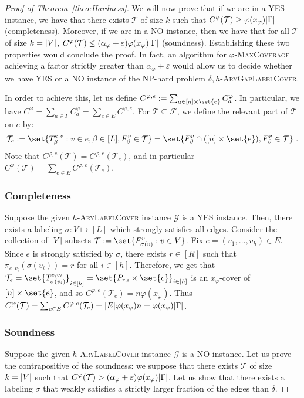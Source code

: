 \begin{proof}[Proof of Theorem~\ref{theo:Hardness}]
We will now prove that if we are in a YES instance, we have that there exists $\mathcal{T}$ of size $k$ such that $C^{\varphi}(\mathcal{T}) \geq \varphi(x_{\varphi})\abs{\Gamma}$ (completeness). Moreover, if we are in a NO instance, then we have that for all $\mathcal{T}$ of size $k = \abs{V}$, $C^{\varphi}(\mathcal{T}) \leq (\alpha_{\varphi} + \varepsilon)\varphi(x_{\varphi})\abs{\Gamma}$ (soundness). Establishing these two properties would conclude the proof. 
In fact, an algorithm for $\varphi$-\textsc{MaxCoverage} achieving a factor strictly greater than $\alpha_{\varphi} + \varepsilon$ would allow us to decide whether we have YES or a NO instance of the \textrm{NP}-hard problem $\delta,h$-\textsc{AryGapLabelCover}.

In order to achieve this, let us define $C^{\varphi,e} := \sum_{a \in [n] \times \set{e}} C^{\varphi}_a$. In particular, we have $C^{\varphi} = \sum_{a \in  \Gamma} C^{\varphi}_a = \sum_{e \in E}C^{\varphi,e}$. For $\mathcal{T} \subseteq \mathcal{F}$, we define the relevant part of $\mathcal{T}$ on $e$ by:
\[\mathcal{T}_e := \set{T_{\beta}^{e,v} : v \in e, \beta \in [L], F^v_{\beta} \in \mathcal{T}} = \set{F^v_{\beta} \cap ([n] \times \set{e}), F^v_{\beta} \in \mathcal{T}}\ .\]
Note that $C^{\varphi,e}(\mathcal{T}) = C^{\varphi,e}(\mathcal{T}_e)$, and in particular $C^{\varphi}(\mathcal{T}) = \sum_{e \in E} C^{\varphi,e}(\mathcal{T}_e)$. 

\subsubsection{Completeness}
Suppose the given $h$-\textsc{AryLabelCover} instance $\mathcal{G}$ is a YES instance. Then, there exists a labeling $\sigma : V \mapsto [L]$ which strongly satisfies all edges. Consider the collection of $\abs{V}$ subsets $\mathcal{T} := \set{F_{\sigma(v)}^v : v \in V}$. Fix $e = (v_1,\ldots,v_h) \in E$. Since $e$ is strongly satisfied by $\sigma$, there exists $r \in [R]$ such that $\pi_{e,v_i}(\sigma(v_i)) = r$ for all $i \in [h]$. Therefore, we get that $\mathcal{T}_e = \set{T_{\sigma(v_i)}^{e,v_i}}_{i \in [h]} = \set{P_{r,i} \times \set{e}}_{i \in [h]}$ is an $x_{\varphi}$-cover of $[n] \times \set{e}$, and so $C^{\varphi,e}(\mathcal{T}_e) = n\varphi(x_{\varphi})$. Thus $C^{\varphi}(\mathcal{T}) = \sum_{e \in E}C^{\varphi,e}(\mathcal{T}_e) = \abs{E}\varphi(x_{\varphi})n = \varphi(x_{\varphi})\abs{\Gamma}$.

\subsubsection{Soundness}
Suppose the given $h$-\textsc{AryLabelCover} instance $\mathcal{G}$ is a NO instance. Let us prove the contrapositive of the soundness: we suppose that there exists $\mathcal{T}$ of size $k = \abs{V}$ such that  $C^{\varphi}(\mathcal{T}) > (\alpha_{\varphi} + \varepsilon)\varphi(x_{\varphi})\abs{\Gamma}$. Let us show that there exists a labeling $\sigma$ that weakly satisfies a strictly larger fraction of the edges than $\delta$.


\end{proof}
